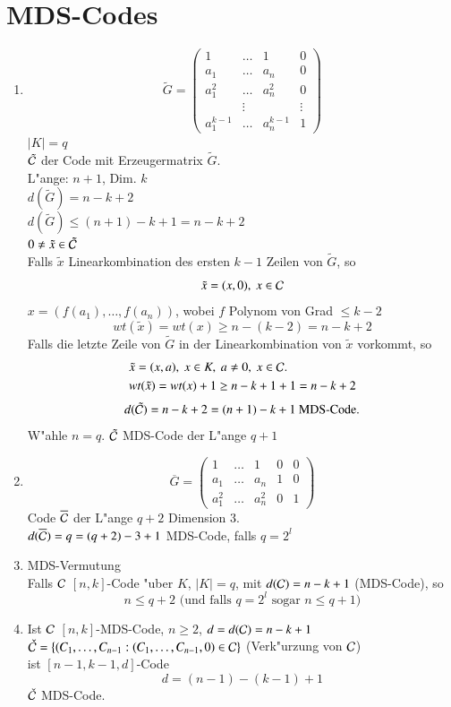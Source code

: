 \section{MDS-Codes}
\begin{enumerate}[(1)]
	\item
	\[
		\tilde{G}=
		\begin{pmatrix}
			1 & \ldots & 1 & 0\\ 
			a_1 & \ldots & a_n & 0 \\ 
			a_1^2 & \ldots & a_n^2 & 0\\ 
			 & \vdots &  & \vdots\\ 
			a_1^{k-1} & \ldots & a_n^{k-1} & 1
		\end{pmatrix}
	\]
	$\left| K \right| = q$\\
	$\tilde{\mathcal{C}}$ der Code mit Erzeugermatrix $\tilde{G}$.\\ L"ange: $n+1$, Dim. $k$\\
	$d(\tilde{G})=n-k+2$\\
	$d(\tilde{G})\leq (n+1)-k+1 = n-k+2$\\ %
	$0 \neq \tilde{x} \in \tilde{\mathcal{C}}$\\
	Falls $ \tilde{x}$ Linearkombination des ersten $k-1$ Zeilen von $ \tilde{G}$, so
	\[
		\tilde{x}=(x,0),\ x\in\mathcal{C}
	\]
	$x=(f(a_1),\ldots,f(a_n))$, wobei $f$ Polynom von Grad $\leq k-2$
	\[
		wt (\tilde{x}) = wt (x) \geq n-(k-2)=n-k+2
	\]
	Falls die letzte Zeile von $ \tilde{G}$ in der Linearkombination von $ \tilde{x}$ vorkommt, so 
	\begin{align*}
		&\tilde{x}=(x,a),\ x\in K,\ a \neq 0,\ x \in \mathcal{C} .\\
		&wt (\tilde{x}) = wt (x) + 1 \geq n-k+1+1=n-k+2
	\end{align*}
	\[
		d (\tilde{\mathcal{C}}) = n-k+2 = (n+1)-k+1 \text{ MDS-Code.}
	\]
	W"ahle $n=q$. $\tilde{\mathcal{C}}$ MDS-Code der L"ange $q + 1$
	\item
	\[
	\overline{G} =
	\begin{pmatrix}
		1 & \ldots & 1 & 0 & 0 \\ 
		a_1 & \ldots & a_n & 1 & 0 \\ 
		a_1^2 & \ldots & a_n^2 & 0 & 1
	\end{pmatrix}
	\]
	Code $ \overline{\mathcal{C}}$ der L"ange $q+2$ Dimension 3.\\
	$d(\overline{\mathcal{C}})=q=(q+2)-3+1$ MDS-Code,	falls $q=2^l$
	\item
	MDS-Vermutung\\
	Falls $\mathcal{C}$ $[n,k]$-Code "uber $K$, $\left| K \right| =q$, mit $d(\mathcal{C})=n-k+1$ (MDS-Code), so
	\[
		n \leq q+2 \text{ (und falls } q=2^l \text{ sogar }n\leq q+1)
	\] 
	\item
	Ist $\mathcal{C}$ $[n,k]$-MDS-Code, $n \geq 2$, $d = d (\mathcal{C}) = n-k+1$\\
	$ \check{\mathcal{C}}=\lbrace (C_1,\ldots,C_{n-1}: (C_1,\ldots,C_{n-1},0) \in \mathcal{C} \rbrace$ (Verk"urzung von $\mathcal{C}$)\\
	ist $[n-1,k-1,d]$-Code
	\[
		d=(n-1)-(k-1)+1
	\]
	$ \check{\mathcal{C}}$ MDS-Code.
\end{enumerate}
